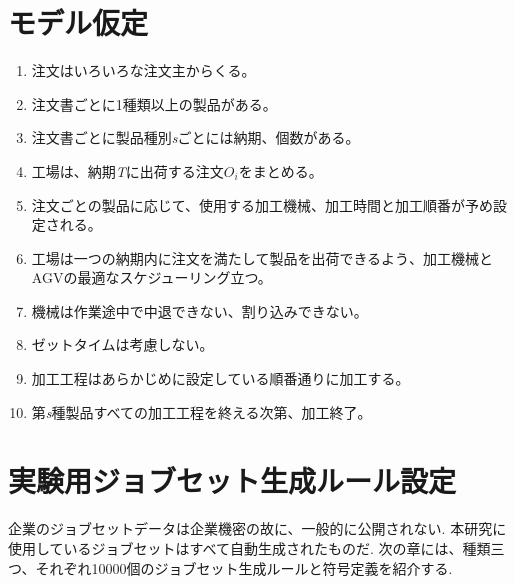 \documentclass[twocolumn]{jarticle}
\begin{document}
\section{モデル仮定}
\begin{enumerate}
    \item 注文はいろいろな注文主からくる。
    \item 注文書ごとに1種類以上の製品がある。
    \item 注文書ごとに製品種別\textit{s}ごとには納期、個数がある。
    \item 工場は、納期\textit{T}に出荷する注文$O_{\textit{i}}$をまとめる。
    \item 注文ごとの製品に応じて、使用する加工機械、加工時間と加工順番が予め設定される。
    \item 工場は一つの納期内に注文を満たして製品を出荷できるよう、加工機械とAGVの最適なスケジューリング立つ。
    \item 機械は作業途中で中退できない、割り込みできない。
    \item ゼットタイムは考慮しない。
    \item 加工工程はあらかじめに設定している順番通りに加工する。
    \item 第\textit{s}種製品すべての加工工程を終える次第、加工終了。
    \end{enumerate}

\section{実験用ジョブセット生成ルール設定}
    企業のジョブセットデータは企業機密の故に、一般的に公開されない.
本研究に使用しているジョブセットはすべて自動生成されたものだ.
次の章には、種類三つ、それぞれ10000個のジョブセット生成ルールと符号定義を紹介する.
\end{document}
